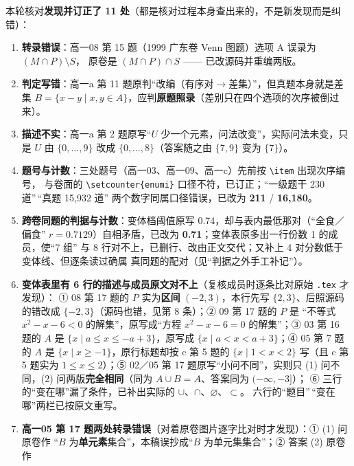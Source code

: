 \documentclass[a4paper,11pt]{article}
\providecommand{\tightlist}{%
  \setlength{\itemsep}{0pt}\setlength{\parskip}{0pt}}
\begin{document}
本轮核对\textbf{发现并订正了 11 处}（都是核对过程本身查出来的，不是新发现而是纠错）：

\begin{enumerate}
\def\labelenumi{\arabic{enumi}.}
\tightlist
\item
  \textbf{转录错误}：高一08 第 15 题（1999 广东卷 Venn 图题）选项 A 误录为 \((M\cap P)\setminus S\)，
  原卷是 \((M\cap P)\cap S\) ------ 已改源码并重编两版。
\item
  \textbf{判定写错}：高一a 第 11 题原判``改编（有序对$\to$差集）''，但真题本身就是差集
  \(B=\{x-y\mid x,y\in A\}\)，应判\textbf{原题照录}（差别只在四个选项的次序被倒过来）。
\item
  \textbf{描述不实}：高一a 第 2 题原写``\(U\) 少一个元素，问法改变''，实际问法未变，只是
  \(U\) 由 \(\{0,\dots,9\}\) 改成 \(\{0,\dots,8\}\)（答案随之由 \(\{7,9\}\) 变为 \(\{7\}\)）。
\item
  \textbf{题号与计数}：三处题号（高一03、高一09、高一c）先前按 \texttt{\textbackslash{}item} 出现次序编号，
  与卷面的 \texttt{\textbackslash{}setcounter\{enumi\}} 口径不符，已订正；``一级题干 230 道''\,``真题 15,932 道''
  两个数字同属口径错误，已改为 \textbf{211} / \textbf{16,180}。
\item
  \textbf{跨卷同题的判据与计数}：变体档阈值原写 0.74，却与表内最低那对（``全食／偏食''
  \(r=0.7129\)）自相矛盾，已改为 \textbf{0.71}；变体表原多出一行份数 1 的成员，使``7 组''
  与 8 行对不上，已删行、改由正文交代；又补上 4 对分数低于变体线、但逐条读过确属
  真同题的配对（见``判据之外手工补记''）。
\item
  \textbf{变体表里有 6 行的描述与成员原文对不上}（复核成员时逐条比对原始 \texttt{.tex} 才发现）：
  ① 08 第 17 题的 \(P\) 实为\textbf{区间} \((-2,3)\)，本行先写 \(\{2,3\}\)、后照源码的错改成
  \(\{-2,3\}\)（源码也错，见第 8 条）；② 09 第 17 题的 \(P\) 是
  ``不等式 \(x^2-x-6<0\) 的解集''，原写成``方程 \(x^2-x-6=0\) 的解集''；③ 03 第 16 题的
  \(A\) 是 \(\{x\mid a\leqslant x\leqslant -a+3\}\)，原写成 \(\{x\mid a<x<a+3\}\)；④ 05 第 7 题的
  \(A\) 是 \(\{x\mid x\geqslant-1\}\)，原行标题却按 c 第 5 题的 \(\{x\mid 1<x<2\}\) 写（且
  c 第 5 题实为 \(1\leqslant x\leqslant 2\)）；⑤ 02／05 第 17 题原写``小问不同''，实则只
  (1) 问不同，(2) 问两版\textbf{完全相同}（同为 \(A\cup B=A\)、答案同为 \((-\infty,-3]\)）；
  ⑥ 三行的``变在哪''漏了条件，已补出实际的 \(\cup\)、\(\cap\)、\(\varnothing\)、\(\subset\)。
  六行的``题目''\,``变在哪''两栏已按原文重写。
\item
  \textbf{高一05 第 17 题两处转录错误}（对着原卷图片逐字比对时才发现）：① (1) 问原卷作
  ``\(B\) 为\textbf{单元素}集合''，本稿误抄成``\(B\) 为单元集集合''；② 答案 (2) 原卷作

\end{enumerate}
\end{document}
